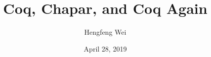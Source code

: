 \documentclass[]{beamer}
\title[Coq, Chapar, and Coq Again]{Coq, Chapar, and Coq Again}
\subtitle{}
\author[Hengfeng Wei]{Hengfeng Wei}
\date{April 28, 2019}
\begin{document}
\renewcommand\figurename{} %
\renewcommand\tablename{}  %

\maketitle





\thankyou{}
\end{document}
